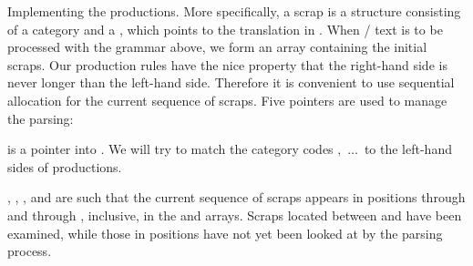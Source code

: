 \endgroup

\fi

Implementing the productions.
More specifically, a scrap is a structure consisting of a category
 and a  , which points to the
translation in
.  When \CEE/ text is to be processed with the grammar
above,
we form an array  containing the initial scraps.
Our production rules have the nice property that the right-hand side is never
longer than the left-hand side. Therefore it is convenient to use sequential
allocation for the current sequence of scraps. Five pointers are used to
manage the parsing:

\yskip\hang {} is a pointer into .  We will try to
match
the category codes $,\,\,%
\ldots\,$
to the left-hand sides of productions.

\yskip\hang {}, , , and  are such that
the current sequence of scraps appears in positions 
through
 and  through , inclusive,
in the  and
 arrays. Scraps located between  and  have
been examined, while those in positions  have not yet been
looked at by the parsing process.

